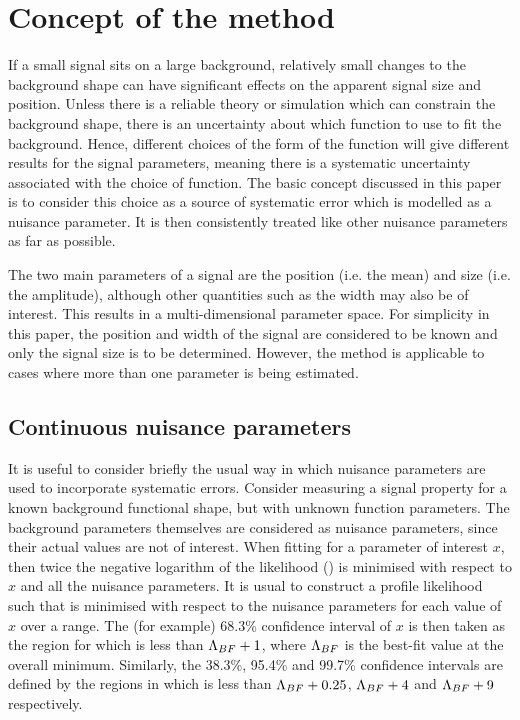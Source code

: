 \section{Concept of the method} %
\label{sec:concept}

If a small signal sits on
a large background, relatively small changes to the background shape can
have significant effects on the apparent signal size and position.
Unless there is a
reliable theory or simulation which can constrain the background shape,
there is an uncertainty about which function to use to fit
the background. Hence, different choices of the form of the function
will give different results for the signal parameters, meaning there is a
systematic uncertainty associated with the choice of function.
The basic concept discussed in this paper is to consider this choice 
as a source of systematic error which is modelled as a nuisance parameter.
It is then consistently treated like other nuisance parameters as far as
possible.

The two main parameters of a signal are the position (i.e. the mean)
and size (i.e. the amplitude), although other
quantities such as the width may also be of interest. This results in a
multi-dimensional parameter space. For simplicity in this paper, the position
and width of the signal are considered to be known and only the signal
size is to be determined. However, the method is applicable to
cases where more than one parameter is being estimated.

\subsection{Continuous nuisance parameters}
\label{sec:concept:continuous}

It is useful to consider briefly the usual way in which nuisance 
parameters are used to incorporate systematic errors. Consider measuring a signal
property for a known background functional shape, but with unknown function
parameters. The background parameters themselves are considered as
nuisance parameters, since their actual values are not of interest.
When fitting for a parameter of interest $x$, then twice the negative logarithm of the
likelihood (\nll) is minimised with respect to $x$ and all the
nuisance parameters. It is usual to construct a profile likelihood
such that \nll is minimised with respect to the nuisance parameters 
for each value of $x$ over a range. 
The (for example) 68.3\% confidence interval of $x$ 
is then
taken as the region for which \nll is less than ${\rm \Lambda}_{BF}+1$,
where ${\rm \Lambda}_{BF}$ is the best-fit value at the overall minimum. 
Similarly, the 38.3\%, 95.4\% and 99.7\% confidence intervals are defined by the 
regions in which \nll is less than ${\rm \Lambda}_{BF}+0.25$, ${\rm \Lambda}_{BF}+4$ 
and ${\rm \Lambda}_{BF}+9$ respectively. 

